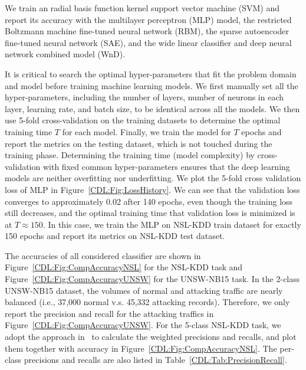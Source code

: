 We train an radial basis function kernel support vector machine (SVM) %
and report its accuracy with the multilayer perceptron (MLP) model,
the restricted Boltzmann machine fine-tuned neural network (RBM),
the sparse autoencoder fine-tuned neural network (SAE),
and the wide linear classifier and deep neural network combined model (WnD).

It is critical to search the optimal hyper-parameters that fit the problem domain and model before training machine learning models. We first manually set all the hyper-parameters, including the number of layers, number of neurons in each layer, learning rate, and batch size, to be identical across all the models.
We then use 5-fold cross-validation on the training datasets to determine the optimal training time $T$
for each model.
Finally, we train the model for $T$ epochs and report the metrics on the testing dataset,
which is not touched during the training phase.
Determining the training time (model complexity) by cross-validation with fixed common hyper-parameters
ensures that the deep learning models are neither overfitting nor underfitting.
We plot the 5-fold cross validation loss of MLP in Figure~\ref{CDL:Fig:LossHistory}.
We can see that the validation loss converges to approximately 0.02 after 140 epochs, even though the training loss still decreases,
and the optimal training time that validation loss is minimized is at $T \approx 150$.
In this case, we train the MLP on NSL-KDD train dataset for exactly 150 epochs and report its metrics on NSL-KDD test dataset.

The accuracies of all considered classifier are shown in Figure~\ref{CDL:Fig:CompAccuracyNSL} for the NSL-KDD task and
Figure~\ref{CDL:Fig:CompAccuracyUNSW} for the UNSW-NB15 task.
In the 2-class UNSW-NB15 dataset,
the volumes of normal and attacking traffic are nearly balanced (i.e., 37,000 normal v.s. 45,332 attacking records).
Therefore, we only report the precision and recall for the attacking traffics in Figure~\ref{CDL:Fig:CompAccuracyUNSW}.
For the 5-class NSL-KDD task, we adopt the approach in~\cite{STL-NIDS}
to calculate the weighted precisions and recalls, and plot them together with accuracy in Figure~\ref{CDL:Fig:CompAccuracyNSL}.
The per-class precisions and recalls are also listed in Table~\ref{CDL:Tab:PrecisionRecall}.

